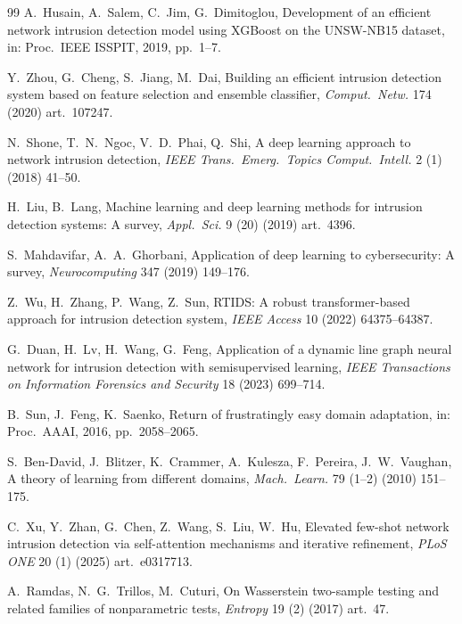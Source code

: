 \documentclass[preprint,12pt,authoryear]{elsarticle}
\begin{document}
\begin{thebibliography}{99}
A.~Husain, A.~Salem, C.~Jim, G.~Dimitoglou, Development of an efficient network
intrusion detection model using XGBoost on the UNSW-NB15 dataset, in: Proc.\ IEEE
ISSPIT, 2019, pp.~1--7.

Y.~Zhou, G.~Cheng, S.~Jiang, M.~Dai, Building an efficient intrusion detection
system based on feature selection and ensemble classifier, \textit{Comput.\ Netw.}
174 (2020) art.~107247.

N.~Shone, T.~N.~Ngoc, V.~D.~Phai, Q.~Shi, A deep learning approach to network
intrusion detection, \textit{IEEE Trans.\ Emerg.\ Topics Comput.\ Intell.} 2 (1)
(2018) 41--50.

H.~Liu, B.~Lang, Machine learning and deep learning methods for intrusion
detection systems: A survey, \textit{Appl.\ Sci.} 9 (20) (2019) art.~4396.

S.~Mahdavifar, A.~A.~Ghorbani, Application of deep learning to cybersecurity: A
survey, \textit{Neurocomputing} 347 (2019) 149--176.

Z.~Wu, H.~Zhang, P.~Wang, Z.~Sun, RTIDS: A robust transformer-based approach for
intrusion detection system, \textit{IEEE Access} 10 (2022) 64375--64387.

G.~Duan, H.~Lv, H.~Wang, G.~Feng, Application of a dynamic line graph neural
network for intrusion detection with semisupervised learning, \textit{IEEE
Transactions on Information Forensics and Security} 18 (2023) 699--714.


B.~Sun, J.~Feng, K.~Saenko, Return of frustratingly easy domain adaptation, in:
Proc.\ AAAI, 2016, pp.~2058--2065.

S.~Ben-David, J.~Blitzer, K.~Crammer, A.~Kulesza, F.~Pereira, J.~W.~Vaughan, A
theory of learning from different domains, \textit{Mach.\ Learn.} 79 (1--2) (2010)
151--175.

C.~Xu, Y.~Zhan, G.~Chen, Z.~Wang, S.~Liu, W.~Hu, Elevated few-shot network
intrusion detection via self-attention mechanisms and iterative refinement,
\textit{PLoS ONE} 20 (1) (2025) art.~e0317713.

A.~Ramdas, N.~G.~Trillos, M.~Cuturi, On Wasserstein two-sample testing and related
families of nonparametric tests, \textit{Entropy} 19 (2) (2017) art.~47.


\end{thebibliography}
\end{document}
